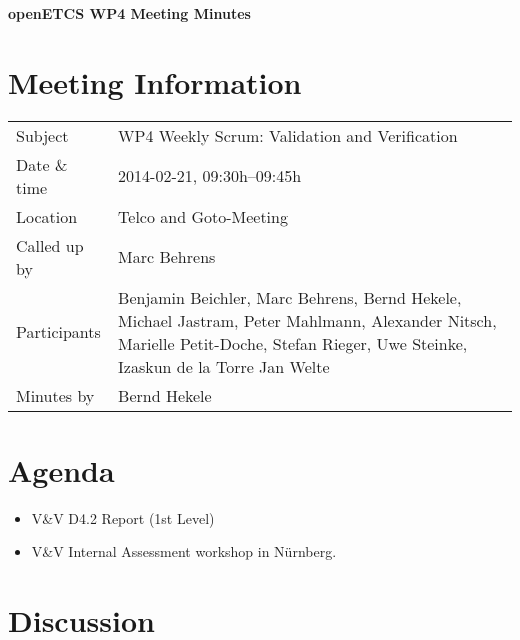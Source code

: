 \documentclass[a4paper, 11pt]{article}
\begin{document}
{\begin{center}\huge\bf openETCS WP4 Meeting Minutes\end{center}}
\section{Meeting Information}

\renewcommand{\arraystretch}{1.5}
\begin{supertabular}{m{.2\textwidth}m{.8\textwidth}}
Subject & WP4 Weekly Scrum: Validation and Verification\\
Date \& time & 2014-02-21, 09:30h--09:45h\\
Location & Telco and Goto-Meeting\\
Called up by & Marc Behrens\\
Participants &
Benjamin Beichler,
Marc Behrens,
Bernd Hekele,
Michael Jastram,
Peter Mahlmann,
Alexander Nitsch,
Marielle Petit-Doche,
Stefan Rieger,
Uwe Steinke,
Izaskun de la Torre
Jan Welte
\\

Minutes by & Bernd Hekele\\

\end{supertabular}
\renewcommand{\arraystretch}{1.0}


\section{{Agenda}}
\begin{itemize}
\item V\&V D4.2 Report (1st Level)
\item V\&V Internal Assessment workshop in N\"urnberg.

\end{itemize}

\section{Discussion}
\end{document}
